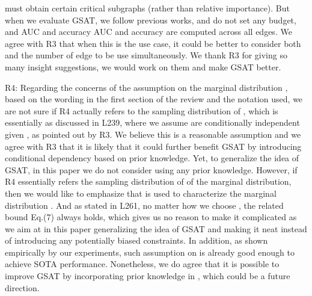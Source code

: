 \documentclass{article}
\begin{document}
must obtain certain critical subgraphs (rather than relative importance). But when we evaluate GSAT, we follow previous works, and do not set any budget, and AUC and accuracy AUC and accuracy are computed across all edges. We agree with R3 that when this is the use case, it could be better to consider both  and the number of edge to be use simultaneously. We thank R3 for giving so many insight suggestions, we would work on them and make GSAT better.

R4: Regarding the concerns of the assumption on the marginal distribution , based on the wording in the first section of the review and the notation used, we are not sure if R4 actually refers to the sampling distribution of , which is essentially  as discussed in L239, where we assume  are conditionally independent given , as pointed out by R3. We believe this is a reasonable assumption and we agree with R3 that it is likely that it could further benefit GSAT by introducing conditional dependency based on prior knowledge. Yet, to generalize the idea of GSAT, in this paper we do not consider using any prior knowledge. However, if R4 essentially refers the sampling distribution of  of the marginal distribution, then we would like to emphasize that  is used to characterize the marginal distribution . And as stated in L261, no matter how we choose , the related bound Eq.(7) always holds, which gives us no reason to make it complicated as we aim at in this paper generalizing the idea of GSAT and making it neat instead of introducing any potentially biased constraints. In addition, as shown empirically by our experiments, such assumption on  is already good enough to achieve SOTA performance. Nonetheless, we do agree that it is possible to improve GSAT by incorporating prior knowledge in , which could be a future direction.
\end{document}
